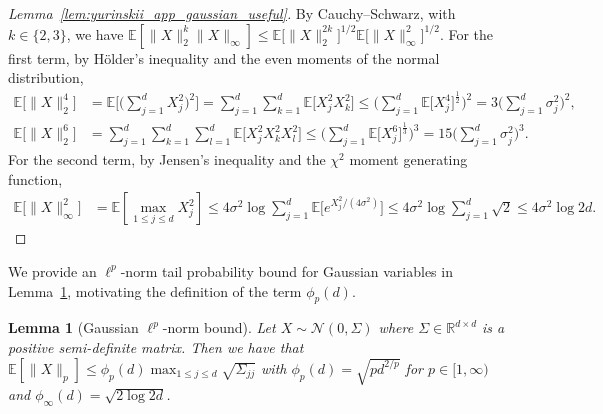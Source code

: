 \documentclass[11pt,lof]{puthesis}
\newcommand{\R}{\ensuremath{\mathbb{R}}}
\newcommand{\E}{\ensuremath{\mathbb{E}}}
\newcommand{\cN}{\ensuremath{\mathcal{N}}}
\theoremstyle{break}
\newtheorem{lemma}{Lemma}[section]
\theoremstyle{proof}
\newtheorem{proof}{Proof}
\begin{document}
\begin{proof}[Lemma~\ref{lem:yurinskii_app_gaussian_useful}]

  By Cauchy--Schwarz, with $k \in \{2,3\}$, we have
  $\E\left[\|X\|_2^{k} \|X\|_\infty \right]
  \leq \E\big[\|X\|_2^{2k} \big]^{1/2} \E\big[\|X\|_\infty^2 \big]^{1/2}$.
  For the first term, by H{\"o}lder's inequality and the even
  moments of the normal distribution,
  \begin{align*}
    \E\big[\|X\|_2^4 \big]
    &=
    \E\Bigg[
      \bigg(
        \sum_{j=1}^d X_j^2
      \bigg)^2
    \Bigg]
    =
    \sum_{j=1}^d \sum_{k=1}^d
    \E\big[
      X_j^2 X_k^2
    \big]
    \leq
    \bigg(
      \sum_{j=1}^d
      \E\big[X_j^4 \big]^{\frac{1}{2}}
    \bigg)^2
    =
    3 \bigg(
      \sum_{j=1}^d
      \sigma_j^2
    \bigg)^2, \\
    \E\big[\|X\|_2^6 \big]
    &=
    \sum_{j=1}^d \sum_{k=1}^d \sum_{l=1}^d
    \E\big[
      X_j^2 X_k^2 X_l^2
    \big]
    \leq
    \bigg(
      \sum_{j=1}^d
      \E\big[X_j^6 \big]^{\frac{1}{3}}
    \bigg)^3
    =
    15 \bigg(
      \sum_{j=1}^d
      \sigma_j^2
    \bigg)^3.
  \end{align*}
  For the second term, by Jensen's inequality and the $\chi^2$ moment
  generating function,
  \begin{align*}
    \E\big[\|X\|_\infty^2 \big]
    &=
    \E\left[
      \max_{1 \leq j \leq d}
      X_j^2
    \right]
    \leq
    4 \sigma^2
    \log
    \sum_{j=1}^d
    \E\Big[
      e^{X_j^2 / (4\sigma^2)}
    \Big]
    \leq
    4 \sigma^2
    \log
    \sum_{j=1}^d
    \sqrt{2}
    \leq
    4 \sigma^2
    \log 2 d.
  \end{align*}
\end{proof}

We provide an $\ell^p$-norm tail probability bound for Gaussian variables in
Lemma~\ref{lem:yurinskii_app_gaussian_pnorm}, motivating the definition of the
term
$\phi_p(d)$.

\begin{lemma}[Gaussian \texorpdfstring{$\ell^p$}{lp}-norm bound]%
  \label{lem:yurinskii_app_gaussian_pnorm}
  Let $X \sim \cN(0, \Sigma)$ where $\Sigma \in \R^{d \times d}$
  is a positive semi-definite matrix. Then we have that
  $\E\left[ \|X\|_p \right] \leq
  \phi_p(d) \max_{1 \leq j \leq d} \sqrt{\Sigma_{j j}}$
  with $\phi_p(d) = \sqrt{pd^{2/p} }$ for $p \in [1,\infty)$
  and $\phi_\infty(d) = \sqrt{2\log 2d}$.
\end{lemma}
\end{document}
